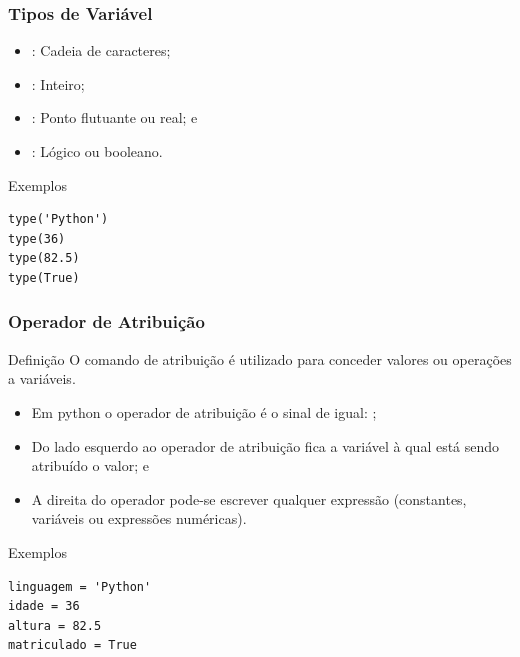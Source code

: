 \documentclass[aspectratio=169]{beamer} %
\begin{document}
\begin{frame}[fragile]
\frametitle{Tipos de Variável}

\begin{itemize}
	\item {} : Cadeia de caracteres;
	\item {} : Inteiro;
	\item {} : Ponto flutuante ou real; e
	\item {} : Lógico ou booleano.
\end{itemize}\vfill

\begin{exampleblock}{Exemplos}
\begin{lstlisting}
type('Python')
type(36)
type(82.5)
type(True)
\end{lstlisting}
\end{exampleblock}
\end{frame}

\begin{frame}[fragile]
\frametitle{Operador de Atribuição}

\begin{block}{Definição}
O comando de atribuição é utilizado para conceder valores ou operações a variáveis.
\end{block}\vfill

\begin{itemize}
	\item Em python o operador de atribuição é o sinal de igual: \structure{=};
	\item Do lado esquerdo ao operador de atribuição fica a variável à qual está
	sendo atribuído o valor; e
	\item A direita do operador pode-se escrever qualquer expressão (constantes,
	variáveis ou expressões numéricas).
\end{itemize}\vfill

\begin{exampleblock}{Exemplos}
	\begin{lstlisting}
linguagem = 'Python'
idade = 36
altura = 82.5
matriculado = True
	\end{lstlisting}
\end{exampleblock}
\end{frame}
\end{document}
